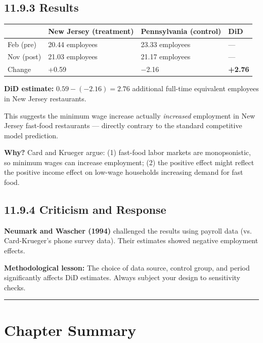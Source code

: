 \subsection{11.9.3 Results}

\begin{center}
\begin{tabular}{@{} l l l l @{}}
\toprule
\textbf{} & \textbf{New Jersey (treatment)} & \textbf{Pennsylvania (control)} & \textbf{DiD} \\
\midrule
Feb (pre) & 20.44 employees & 23.33 employees & --- \\
Nov (post) & 21.03 employees & 21.17 employees & --- \\
Change & +0.59 & $-$2.16 & \textbf{+2.76} \\
\bottomrule
\end{tabular}
\end{center}

\textbf{DiD estimate:} $0.59 - (-2.16) = 2.76$ additional full-time equivalent employees in New Jersey restaurants.

This suggests the minimum wage increase actually \textit{increased} employment in New Jersey fast-food restaurants --- directly contrary to the standard competitive model prediction.

\textbf{Why?} Card and Krueger argue: (1) fast-food labor markets are monopsonistic, so minimum wages can increase employment; (2) the positive effect might reflect the positive income effect on low-wage households increasing demand for fast food.

\subsection{11.9.4 Criticism and Response}

\textbf{Neumark and Wascher (1994)} challenged the results using payroll data (vs. Card-Krueger's phone survey data). Their estimates showed negative employment effects.

\textbf{Methodological lesson:} The choice of data source, control group, and period significantly affects DiD estimates. Always subject your design to sensitivity checks.

\medskip\hrule\medskip

\section{Chapter Summary}

